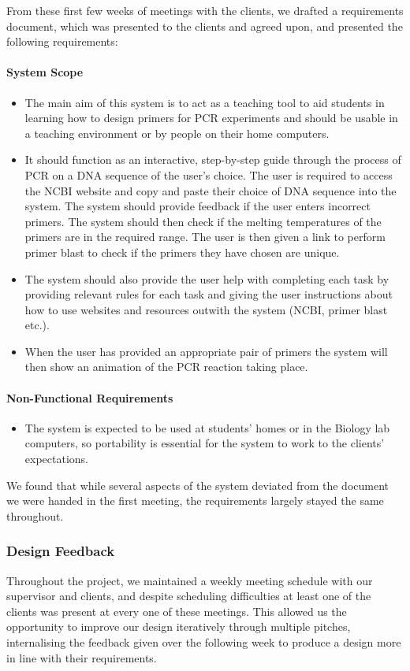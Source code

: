 From these first few weeks of meetings with the clients, we drafted a
requirements document, which was presented to the clients and agreed upon,
and presented the following requirements:

\paragraph{System Scope}
\begin{itemize}
\item{The main aim of this system is to act as a teaching tool to aid 
students in learning how to design primers for PCR experiments and 
should be usable in a teaching environment or by people on their home 
computers.}
\item{It should function as an interactive, step-by-step guide through 
the process of PCR on a DNA sequence of the user's choice. The user is 
required to access the NCBI website \cite{ncbi} and copy and paste
their choice of DNA sequence into the system.
The system should provide feedback if the user enters incorrect
primers.
The system should then check if the melting temperatures of the
primers are in the required range.
The user is then given a link to perform primer blast to check if the
primers they have chosen are unique.}
\item{The system should also provide the user help with completing each 
task by providing relevant rules for each task and giving the user 
instructions about how to use websites and resources outwith the system 
(NCBI, primer blast etc.).}
\item{When the user has provided an appropriate pair of primers the 
system will then show an animation of the PCR reaction taking place.}
\end{itemize}
\paragraph{Non-Functional Requirements}
\begin{itemize}
\item{The system is expected to be used at students’ homes or in the 
Biology lab computers, so portability is essential for the system to 
work to the clients’ expectations.}
\end{itemize}
We found that while several aspects of the system deviated from the
document we were handed in the first meeting, the requirements largely
stayed the same throughout.

\subsubsection{Design Feedback}
Throughout the project, we maintained a weekly meeting schedule with our
supervisor and clients, and despite scheduling difficulties at least one
of the clients was present at every one of these meetings. This allowed
us the opportunity to improve our design iteratively through multiple
pitches, internalising the feedback given over the following week to 
produce a design more in line with their requirements.

